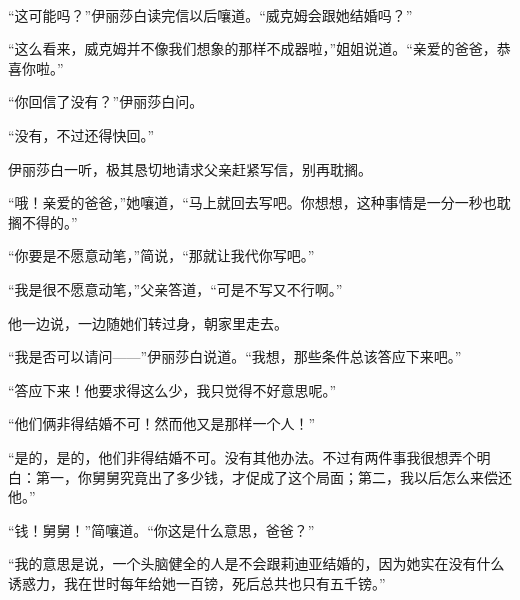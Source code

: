 \par “这可能吗？”伊丽莎白读完信以后嚷道。“威克姆会跟她结婚吗？”
\par “这么看来，威克姆并不像我们想象的那样不成器啦，”姐姐说道。“亲爱的爸爸，恭喜你啦。”
\par “你回信了没有？”伊丽莎白问。
\par “没有，不过还得快回。”
\par 伊丽莎白一听，极其恳切地请求父亲赶紧写信，别再耽搁。
\par “哦！亲爱的爸爸，”她嚷道，“马上就回去写吧。你想想，这种事情是一分一秒也耽搁不得的。”
\par “你要是不愿意动笔，”简说，“那就让我代你写吧。”
\par “我是很不愿意动笔，”父亲答道，“可是不写又不行啊。”
\par 他一边说，一边随她们转过身，朝家里走去。
\par “我是否可以请问——”伊丽莎白说道。“我想，那些条件总该答应下来吧。”
\par “答应下来！他要求得这么少，我只觉得不好意思呢。”
\par “他们俩非得结婚不可！然而他又是那样一个人！”
\par “是的，是的，他们非得结婚不可。没有其他办法。不过有两件事我很想弄个明白：第一，你舅舅究竟出了多少钱，才促成了这个局面；第二，我以后怎么来偿还他。”
\par “钱！舅舅！”简嚷道。“你这是什么意思，爸爸？”
\par “我的意思是说，一个头脑健全的人是不会跟莉迪亚结婚的，因为她实在没有什么诱惑力，我在世时每年给她一百镑，死后总共也只有五千镑。”
